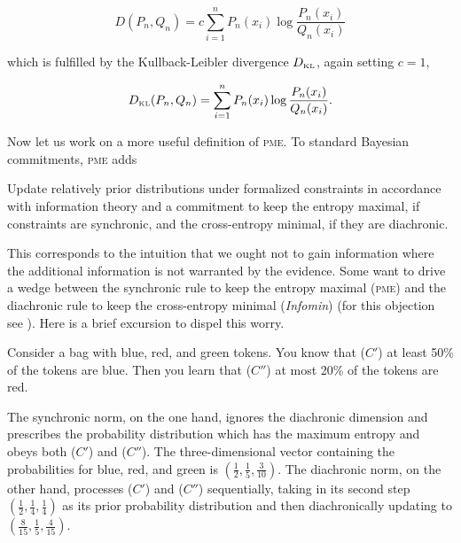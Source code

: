 \documentclass[phd,12pt,oneside]{ubcthesis}
\begin{document}
\begin{equation}
  \label{eq:enuamich}
  D(P_{n},Q_{n})=c\sum_{i=1}^{n}P_{n}(x_{i})\log\frac{P_{n}(x_{i})}{Q_{n}(x_{i})}
\end{equation}

{\noindent}which is fulfilled by the Kullback-Leibler divergence $D_{\mbox{\tiny
    KL}}$, again setting $c=1$,

\begin{equation}
  \label{eq:xaingouw}
  D_{\mbox{\tiny KL}}(P_{n},Q_{n})=\sum_{i=1}^{n}P_{n}(x_{i})\log\frac{P_{n}(x_{i})}{Q_{n}(x_{i})}.
\end{equation}

Now let us work on a more useful definition of \textsc{pme}. To
standard Bayesian commitments, \textsc{pme} adds

\begin{quotex}
  Update relatively prior distributions under formalized constraints
  in accordance with information theory and a commitment to keep the
  entropy maximal, if constraints are synchronic, and the
  cross-entropy minimal, if they are diachronic.
\end{quotex}

{\noindent}This corresponds to the intuition that we ought not to gain
information where the additional information is not warranted by the
evidence. Some want to drive a wedge between the synchronic rule to
keep the entropy maximal (\textsc{pme}) and the diachronic rule to
keep the cross-entropy minimal (\emph{Infomin}) (for this objection
see ). Here is a brief excursion to dispel
this worry.

\begin{quotex}
  \label{ex:piecemeal} Consider a bag
  with blue, red, and green tokens. You know that ($C'$) at least 50\%
  of the tokens are blue. Then you learn that ($C''$) at most 20\% of
  the tokens are red.
\end{quotex}

The synchronic norm, on the one hand, ignores the diachronic dimension
and prescribes the probability distribution which has the maximum
entropy and obeys both ($C'$) and ($C''$). The three-dimensional
vector containing the probabilities for blue, red, and green is
$(\frac{1}{2},\frac{1}{5},\frac{3}{10})$. The diachronic norm, on the
other hand, processes ($C'$) and ($C''$) sequentially, taking in its
second step $(\frac{1}{2},\frac{1}{4},\frac{1}{4})$ as its prior
probability distribution and then diachronically updating to
$(\frac{8}{15},\frac{1}{5},\frac{4}{15})$.
\end{document}
